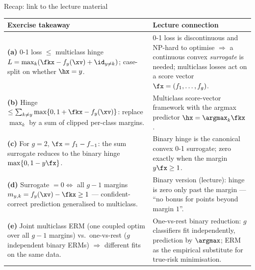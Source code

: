 \documentclass[aspectratio=169]{beamer}
\newcommand{\fyx}{f_y(\xv)}
\begin{document}
\begin{frame}{Recap: link to the lecture material}
	\scriptsize
	\renewcommand{\arraystretch}{1.35}
	\begin{tabular}{p{6.2cm}|p{6.2cm}}
		\textbf{Exercise takeaway} & \textbf{Lecture connection} \\
		\hline
		\textbf{(a)} 0-1 loss $\leq$ multiclass hinge $L = \max_k(\fkx - \fyx + \id_{y \neq k})$; case-split on whether $\hx = y$.
		&
		0-1 loss is discontinuous and NP-hard to optimise $\Rightarrow$ a continuous convex \emph{surrogate} is needed; multiclass losses act on a score vector $\fx = (f_1, \ldots, f_g)$.
		\\\hline
		\textbf{(b)} Hinge $\leq \sum_{k \neq y}\max\{0, 1 + \fkx - \fyx\}$: replace $\max_k$ by a sum of clipped per-class margins.
		&
		Multiclass score-vector framework with the argmax predictor $\hx = \argmax_k \fkx$.
		\\\hline
		\textbf{(c)} For $g = 2$, $\fx = f_1 - f_{-1}$: the sum surrogate reduces to the binary hinge $\max\{0, 1 - y\fx\}$.
		&
		Binary hinge is the canonical convex 0-1 surrogate; zero exactly when the margin $y\fx \geq 1$.
		\\\hline
		\textbf{(d)} Surrogate $= 0 \iff $ all $g - 1$ margins $m_{y,k} = \fyx - \fkx \geq 1$ --- confident-correct prediction generalised to multiclass.
		&
		Binary version (lecture): hinge is zero only past the margin --- ``no bonus for points beyond margin $1$''.
		\\\hline
		\textbf{(e)} Joint multiclass ERM (one coupled optim over all $g-1$ margins) vs.\ one-vs-rest ($g$ independent binary ERMs) $\Rightarrow$ different fits on the same data.
		&
		One-vs-rest binary reduction: $g$ classifiers fit independently, prediction by $\argmax$; ERM as the empirical substitute for true-risk minimisation.
		\\
	\end{tabular}
\end{frame}
\end{document}
